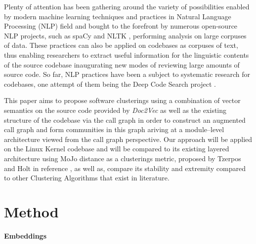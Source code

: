 \documentclass[sigconf,review, anonymous]{acmart}
\begin{document}
Plenty of attention has been gathering around the variety of possibilities enabled by 
modern machine learning techniques and practices in Natural Language Processing (NLP) 
field and bought to the forefront by numerous open-source NLP projects, such as spaCy 
\cite{spacy} and NLTK \cite{nltk}, performing analysis on large corpuses of data. These 
practices can also be applied on codebases as corpuses of text, thus enabling researchers 
to extract useful information for the linguistic contents of the source codebase 
inaugurating new modes of reviewing large amounts of source code. So far, NLP practices 
have been a subject to systematic research for codebases, one attempt of them being the 
Deep Code Search project \cite{deepcodesearch}.

This paper aims to propose software clusterings using a combination of vector semantics on the source code provided by \emph{Doc2Vec} as well as the existing structure of 
the codebase via the call graph in order to construct an augmented call graph and form communities in this graph ariving at a module--level 
architecture viewed from the call graph perspective. Our approach will be applied on the 
Linux Kernel codebase and will be compared to its existing layered architecture using 
MoJo distance as a clusterings metric, proposed by Tzerpos and Holt in reference \cite{mojo}, 
as well as, compare its stability and extremity compared to other Clustering 
Algorithms that exist in literature.  






\section{Method} 

\paragraph{Embeddings} 
\end{document}
